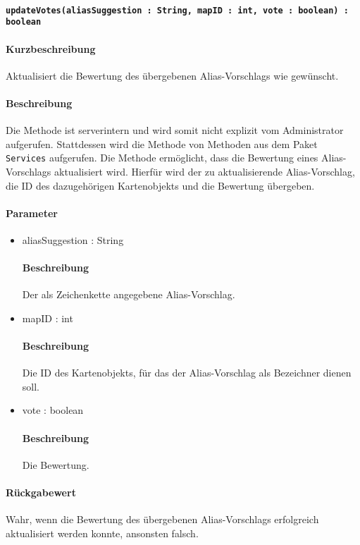 \paragraph{\texttt{updateVotes(aliasSuggestion : String, mapID : int, vote : boolean) : boolean}}%
\paragraph*{Kurzbeschreibung}
Aktualisiert die Bewertung des übergebenen Alias-Vorschlags wie gewünscht.
\paragraph*{Beschreibung}
Die Methode ist serverintern und wird somit nicht explizit vom Administrator aufgerufen.
Stattdessen wird die Methode von Methoden aus dem Paket \texttt{Services} aufgerufen.
Die Methode ermöglicht, dass die Bewertung eines Alias-Vorschlags aktualisiert wird.
Hierfür wird der zu aktualisierende Alias-Vorschlag, die ID des dazugehörigen Kartenobjekts und die Bewertung übergeben.
\paragraph*{Parameter}
\begin{itemize}
    \item aliasSuggestion : String
    		\paragraph*{Beschreibung}
    		Der als Zeichenkette angegebene Alias-Vorschlag.
    	\item mapID : int
    		\paragraph*{Beschreibung}
    		Die ID des Kartenobjekts, für das der Alias-Vorschlag als Bezeichner dienen soll.
    	\item vote : boolean
    		\paragraph*{Beschreibung}
    		Die Bewertung.
\end{itemize}
\paragraph*{Rückgabewert}
Wahr, wenn die Bewertung des übergebenen Alias-Vorschlags erfolgreich aktualisiert werden konnte, ansonsten falsch.
